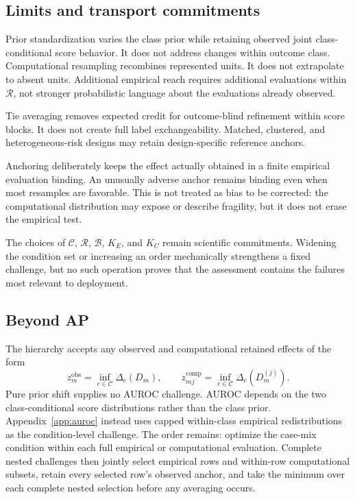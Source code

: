 \documentclass[11pt]{article}
\newcommand{\Regime}{\mathcal{R}}
\newcommand{\CSet}{\mathcal{C}}
\newcommand{\Boot}{\mathcal{B}}
\theoremstyle{remark}
\begin{document}
\subsection{Limits and transport commitments}

Prior standardization varies the class prior while retaining observed joint
class-conditional score behavior. It does not address changes within outcome
class. Computational resampling recombines represented units. It does not
extrapolate to absent units. Additional empirical reach requires additional
evaluations within $\Regime$, not stronger probabilistic language about the
evaluations already observed.

Tie averaging removes expected credit for outcome-blind refinement within
score blocks. It does not create full label exchangeability. Matched,
clustered, and heterogeneous-risk designs may retain design-specific reference
anchors.

Anchoring deliberately keeps the effect actually obtained in a finite
empirical evaluation binding. An unusually adverse anchor remains binding even
when most resamples are favorable. This is not treated as bias to be corrected:
the computational distribution may expose or describe fragility, but it does
not erase the empirical test.

The choices of $\CSet$, $\Regime$, $\Boot$, $K_E$, and $K_C$ remain
scientific commitments. Widening the condition set or increasing an order
mechanically strengthens a fixed challenge, but no such operation proves that
the assessment contains the failures most relevant to deployment.

\subsection{Beyond AP}

The hierarchy accepts any observed and computational retained effects of the
form
\[
z_m^{\mathrm{obs}}=\inf_{c\in\CSet}\Delta_c(D_m),
\qquad
z_{mj}^{\mathrm{comp}}=\inf_{c\in\CSet}\Delta_c(D_m^{(j)}).
\]
Pure prior shift supplies no AUROC challenge. AUROC depends on the two
class-conditional score distributions rather than the class prior.
Appendix~\ref{app:auroc} instead uses capped within-class empirical
redistributions as the condition-level challenge. The order remains: optimize
the case-mix condition within each full empirical or computational evaluation.
Complete nested challenges then jointly select empirical rows and within-row
computational subsets, retain every selected row's observed anchor, and take
the minimum over each complete nested selection before any averaging occurs.
\end{document}
